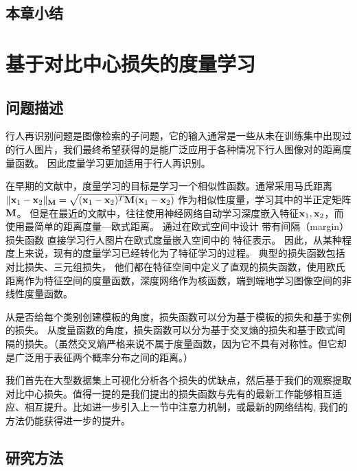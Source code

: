 \section{本章小结}

\chapter{基于对比中心损失的度量学习}

\section{问题描述}

行人再识别问题是图像检索的子问题，它的输入通常是一些从未在训练集中出现过的行人图片，我们最终希望获得的是能广泛应用于各种情况下行人图像对的距离度量函数。
因此度量学习更加适用于行人再识别。

在早期的文献中，度量学习的目标是学习一个相似性函数。通常采用马氏距离
$\Vert {\mathbf{x}}_1 - {\mathbf{x}}_2\Vert_{\mathbf{M}}=
	\sqrt{({\mathbf{x}}_1-{\mathbf{x}}_2)^T {\mathbf{M}} ({\mathbf{x}}_1 - {\mathbf{x}}_2) }$
作为相似性度量，学习其中的半正定矩阵${\mathbf{M}}$。
但是在最近的文献中，往往使用神经网络自动学习深度嵌入特征${\mathbf{x}}_1, {\mathbf{x}}_2$，而使用最简单的距离度量---欧式距离。
通过在欧式空间中设计
带有间隔（margin）损失函数
直接学习行人图片在欧式度量嵌入空间中的
特征表示。
因此，从某种程度上来说，现有的度量学习已经转化为了特征学习的过程。
典型的损失函数包括对比损失、三元组损失，
他们都在特征空间中定义了直观的损失函数，使用欧氏距离作为特征空间的度量函数，深度网络作为核函数，端到端地学习图像空间的非线性度量函数。

从是否给每个类别创建模板的角度，损失函数可以分为基于模板的损失和基于实例的损失。
从度量函数的角度，损失函数可以分为基于交叉熵的损失和基于欧式间隔的损失。（虽然交叉熵严格来说不属于度量函数，因为它不具有对称性。但它却是广泛用于表征两个概率分布之间的距离。）

我们首先在大型数据集上可视化分析各个损失的优缺点，然后基于我们的观察提取对比中心损失。值得一提的是我们提出的损失函数与先有的最新工作能够相互适应、相互提升。比如进一步引入上一节中注意力机制\misscite，或最新的网络结构\misscite, 我们的方法仍能获得进一步的提升。

\section{研究方法}
